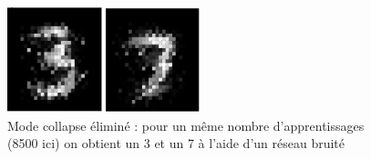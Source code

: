 \begin{figure}[h]
\begin{center}
\includegraphics[width=0.5\textwidth]{images/gan_bruite.png}\caption{Mode collapse éliminé : pour un même nombre d'apprentissages (8500 ici) on obtient un 3 et un 7 à l'aide d'un réseau bruité}
\end{center}
\end{figure}


